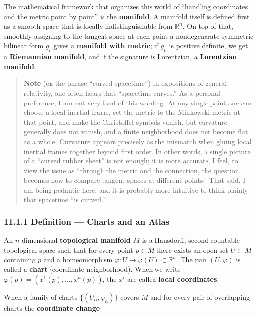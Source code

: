 \documentclass[a4paper,12pt,openany]{book}
\begin{document}
The mathematical framework that organizes this world of ``handling
coordinates and the metric point by point'' is the \textbf{manifold}. A
manifold itself is defined first as a smooth space that is locally
indistinguishable from \(\mathbb{R}^n\). On top of that, smoothly
assigning to the tangent space at each point a nondegenerate symmetric
bilinear form \(g_p\) gives a \textbf{manifold with metric}; if \(g_p\)
is positive definite, we get a \textbf{Riemannian manifold}, and if the
signature is Lorentzian, a \textbf{Lorentzian manifold}.

\begin{quote}
\textbf{Note} (on the phrase ``curved spacetime'') In expositions of
general relativity, one often hears that ``spacetime curves.'' As a
personal preference, I am not very fond of this wording. At any single
point one can choose a local inertial frame, set the metric to the
Minkowski metric at that point, and make the Christoffel symbols vanish,
but curvature generally does not vanish, and a finite neighborhood does
not become flat as a whole. Curvature appears precisely as the mismatch
when gluing local inertial frames together beyond first order. In other
words, a single picture of a ``curved rubber sheet'' is not enough; it
is more accurate, I feel, to view the issue as ``through the metric and
the connection, the question becomes how to compare tangent spaces at
different points.'' That said, I am being pedantic here, and it is
probably more intuitive to think plainly that spacetime ``is curved.''
\end{quote}

\hypertarget{definition-charts-and-an-atlas}{%
\subsubsection{11.1.1 Definition — Charts and an
Atlas}\label{definition-charts-and-an-atlas}}

An \(n\)-dimensional \textbf{topological manifold} \(M\) is a Hausdorff,
second-countable topological space such that for every point \(p \in M\)
there exists an open set \(U \subset M\) containing \(p\) and a
homeomorphism \(\varphi: U \to \varphi(U) \subset \mathbb{R}^n\). The
pair \((U, \varphi)\) is called a \textbf{chart} (coordinate
neighborhood). When we write \(\varphi(p) = (x^1(p), \dots, x^n(p))\),
the \(x^i\) are called \textbf{local coordinates}.

When a family of charts \(\{(U_\alpha, \varphi_\alpha)\}\) covers \(M\)
and for every pair of overlapping charts the \textbf{coordinate change}
\end{document}
